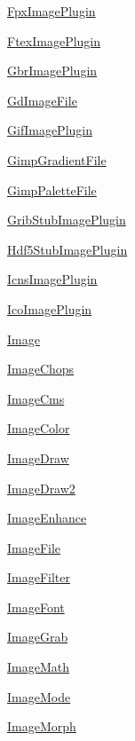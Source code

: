 \begin{DoxyCompactItemize}
 \hyperlink{namespacePIL_1_1FpxImagePlugin}{Fpx\+Image\+Plugin}
\item 
 \hyperlink{namespacePIL_1_1FtexImagePlugin}{Ftex\+Image\+Plugin}
\item 
 \hyperlink{namespacePIL_1_1GbrImagePlugin}{Gbr\+Image\+Plugin}
\item 
 \hyperlink{namespacePIL_1_1GdImageFile}{Gd\+Image\+File}
\item 
 \hyperlink{namespacePIL_1_1GifImagePlugin}{Gif\+Image\+Plugin}
\item 
 \hyperlink{namespacePIL_1_1GimpGradientFile}{Gimp\+Gradient\+File}
\item 
 \hyperlink{namespacePIL_1_1GimpPaletteFile}{Gimp\+Palette\+File}
\item 
 \hyperlink{namespacePIL_1_1GribStubImagePlugin}{Grib\+Stub\+Image\+Plugin}
\item 
 \hyperlink{namespacePIL_1_1Hdf5StubImagePlugin}{Hdf5\+Stub\+Image\+Plugin}
\item 
 \hyperlink{namespacePIL_1_1IcnsImagePlugin}{Icns\+Image\+Plugin}
\item 
 \hyperlink{namespacePIL_1_1IcoImagePlugin}{Ico\+Image\+Plugin}
\item 
 \hyperlink{namespacePIL_1_1Image}{Image}
\item 
 \hyperlink{namespacePIL_1_1ImageChops}{Image\+Chops}
\item 
 \hyperlink{namespacePIL_1_1ImageCms}{Image\+Cms}
\item 
 \hyperlink{namespacePIL_1_1ImageColor}{Image\+Color}
\item 
 \hyperlink{namespacePIL_1_1ImageDraw}{Image\+Draw}
\item 
 \hyperlink{namespacePIL_1_1ImageDraw2}{Image\+Draw2}
\item 
 \hyperlink{namespacePIL_1_1ImageEnhance}{Image\+Enhance}
\item 
 \hyperlink{namespacePIL_1_1ImageFile}{Image\+File}
\item 
 \hyperlink{namespacePIL_1_1ImageFilter}{Image\+Filter}
\item 
 \hyperlink{namespacePIL_1_1ImageFont}{Image\+Font}
\item 
 \hyperlink{namespacePIL_1_1ImageGrab}{Image\+Grab}
\item 
 \hyperlink{namespacePIL_1_1ImageMath}{Image\+Math}
\item 
 \hyperlink{namespacePIL_1_1ImageMode}{Image\+Mode}
\item 
 \hyperlink{namespacePIL_1_1ImageMorph}{Image\+Morph}
\item 

\end{DoxyCompactItemize}
